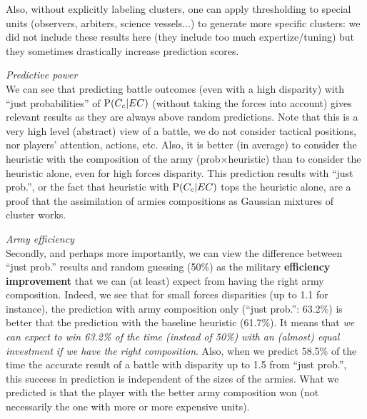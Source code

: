 Also, without explicitly labeling clusters, one can apply thresholding to special units (observers, arbiters, science vessels...) to generate more specific clusters: we did not include these results here (they include too much expertize/tuning) but they sometimes drastically increase prediction scores. %

\vspace{0.2cm}
\textit{Predictive power}\\
We can see that predicting battle outcomes (even with a high disparity) with ``just probabilities'' of $\mathrm{P}(C_c|EC)$ (without taking the forces into account) gives relevant results as they are always above random predictions. Note that this is a very high level (abstract) view of a battle, we do not consider tactical positions, nor players' attention, actions, etc. Also, it is better (in average) to consider the heuristic with the composition of the army (prob$\times$heuristic) than to consider the heuristic alone, even for high forces disparity. This prediction results with ``just prob.'', or the fact that heuristic with $\mathrm{P}(C_c|EC)$ tops the heuristic alone, are a proof that the assimilation of armies compositions as Gaussian mixtures of cluster works.

\vspace{0.2cm}
\textit{Army efficiency}\\
Secondly, and perhaps more importantly, we can view the difference between ``just prob.'' results and random guessing (50\%) as the military \textbf{efficiency improvement} that we can (at least) expect from having the right army composition. 
Indeed, we see that for small forces disparities (up to 1.1 for instance), the prediction with army composition only (``just prob.'': 63.2\%) is better that the prediction with the baseline heuristic (61.7\%). It means that \textit{we can expect to win 63.2\% of the time (instead of 50\%) with an (almost) equal investment if we have the right composition}. %
Also, when we predict 58.5\% of the time the accurate result of a battle with disparity up to 1.5 from ``just prob.'', this success in prediction is independent of the sizes of the armies. What we predicted is that the player with the better army composition won (not necessarily the one with more or more expensive units). 


